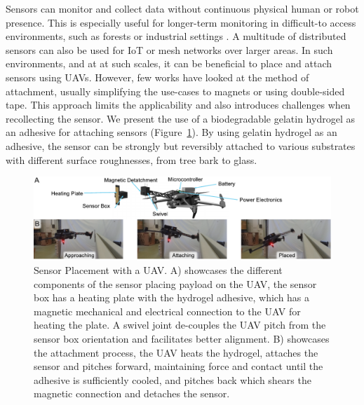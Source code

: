 Sensors can monitor and collect data without continuous physical human or robot presence. This is especially useful for longer-term monitoring in difficult-to access environments, such as forests or industrial settings \cite{Geckeler2022a, Hamaza, Jarvis2018}. A multitude of distributed sensors can also be used for IoT or mesh networks over larger areas. In such environments, and at at such scales, it can be beneficial to place and attach sensors using UAVs. 
However, few works have looked at the method of attachment, usually simplifying the use-cases to magnets or using double-sided tape. This approach limits the applicability and also introduces challenges when recollecting the sensor. We present the use of a biodegradable gelatin hydrogel as an adhesive for attaching sensors (Figure~\ref{fig:fig4-placeholder}). By using gelatin hydrogel as an adhesive, the sensor can be strongly but reversibly attached to various substrates with different surface roughnesses, from tree bark to glass.

\begin{figure}
  \includegraphics[width=\linewidth]{figures/fig-4-sensor-placement-placeholder/fig-4-sensor-placement-placeholder.pdf}
  \caption{Sensor Placement with a UAV. A) showcases the different components of the sensor placing payload on the UAV, the sensor box has a heating plate with the hydrogel adhesive, which has a magnetic mechanical and electrical connection to the UAV for heating the plate. A swivel joint de-couples the UAV pitch from the sensor box orientation and facilitates better alignment. B) showcases the attachment process, the UAV heats the hydrogel, attaches the sensor and pitches forward, maintaining force and contact until the adhesive is sufficiently cooled, and pitches back which shears the magnetic connection and detaches the sensor.}
  \label{fig:fig4-placeholder}
\end{figure}

